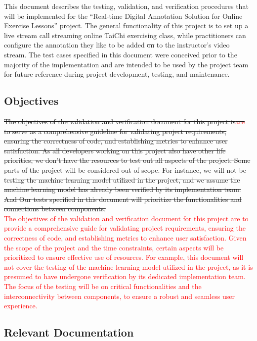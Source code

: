 \documentclass[12pt, titlepage]{article}
\newcommand{\rt}[1]{\textcolor{red}{#1}}
\begin{document}
This document describes the testing, validation, and verification procedures
that will be implemented for the “Real-time Digital Annotation Solution for
Online Exercise Lessons” project. The general functionality of this project is
to set up a live stream call streaming online TaiChi exercising class, while
practitioners can configure the annotation they like to be added \sout{on} to the
instructor’s video stream. The test cases specified in this document were
conceived prior to the majority of the implementation and are intended to be
used by the project team for future reference during project development,
testing, and maintenance.

\subsection{Objectives}

\sout{The objectives of the validation and verification document for this project \sout{is}\rt{are}
to serve as a comprehensive guideline for validating project requirements,
ensuring the correctness of code, and establishing metrics to enhance user
satisfaction. As all developers working on this project also have other life
priorities, we don’t have the resources to test out all aspects of the project.
Some parts of the project will be considered out of scope. For instance, we will
not be testing the machine learning model utilized in the project, and we assume
the machine learning model has already been verified by its implementation team.
\sout{And} Our tests specified in this document will prioritize the functionalities and
connections between components.}\\
\rt{The objectives of the validation and verification document for this project are to provide 
a comprehensive guide for validating project requirements, ensuring the correctness of code, 
and establishing metrics to enhance user satisfaction. Given the scope of the project and the 
time constraints, certain aspects will be prioritized to ensure effective use of resources. For 
example, this document will not cover the testing of the machine learning model utilized in the 
project, as it is presumed to have undergone verification by its dedicated implementation team. 
The focus of the testing will be on critical functionalities and the interconnectivity between 
components, to ensure a robust and seamless user experience.}


\subsection{Relevant Documentation}
\end{document}
